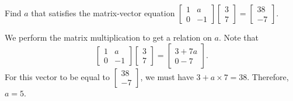 \documentclass[../main.tex]{subfiles}
\begin{document}
\begin{exercise}
  Find \(a\) that satisfies the matrix-vector equation \(\begin{bmatrix} 1 & a \\ 0 & -1 \end{bmatrix} \begin{bmatrix} 3 \\ 7 \end{bmatrix} = \begin{bmatrix} 38 \\ -7 \end{bmatrix}\).

  \begin{solution}
    We perform the matrix multiplication to get a relation on \(a\). Note that
    \[
      \begin{bmatrix} 1 & a \\ 0 & -1 \end{bmatrix} \begin{bmatrix} 3 \\ 7 \end{bmatrix} = 
      \begin{bmatrix}
        3 + 7a \\
        0 - 7
      \end{bmatrix}.
    \]
    For this vector to be equal to \(\begin{bmatrix} 38 \\ -7\end{bmatrix}\), we must have \(3 + a \times 7 = 38\). Therefore, \(a = 5\).
  \end{solution}
\end{exercise}
\end{document}
